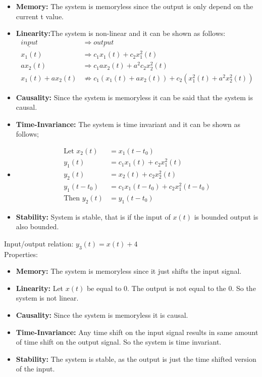 \documentclass[letterpaper,12pt]{article}
\begin{document}
\begin{itemize}
    \item \textbf{Memory:} The system is memoryless since the output is only depend on the current t value.
    \item \textbf{Linearity:}The system is non-linear and it can be shown as follows: \begin{equation}\begin{split}
        \underline{input} &\Rightarrow \underline{output} \\
        x_1(t)  & \Rightarrow c_1 x_1(t) + c_2 x_1^2(t) \\
        a x_2(t) & \Rightarrow  c_1 a x_2(t) + a^2 c_2 x_2^2(t) \\
        x_1(t) +  a x_2(t)  & \not\Rightarrow   c_1 (x_1(t) + a x_2(t)) + c_2 (x_1^2(t) + a^2 x_2^2(t) )
          \end{split}
    \end{equation} 
    \item \textbf{Causality:} Since the system is memoryless it can be said that the system is causal.
    \item \textbf{Time-Invariance:} The system is time invariant and it can be shown as follows;
    \item \begin{equation}
        \begin{split}
            \text{Let } x_2(t) &= x_1(t-t_0) \\
            y_1(t) &= c_1 x_1(t) + c_2 x_1^2(t) \\ 
            y_2(t) &= x_2(t) + c_2 x_2^2(t) \\
            y_1(t-t_0) &=    c_1 x_1(t-t_0) + c_2 x_1^2(t-t_0) \\
            \text{Then  } y_2(t) &= y_1(t-t_0)
        \end{split}
    \end{equation}
    \item \textbf{Stability:} System is stable, that is if the input of \(x(t)\) is bounded output is also bounded.
\end{itemize}


Input/output relation: \(y_3(t)= x(t)+4 \)
\\ Properties:
\begin{itemize}
    \item \textbf{Memory:} The system is memoryless since it just shifts the input signal.
    \item \textbf{Linearity:} Let  \(x(t)\) be equal to 0. The output is not equal to the 0. So the system is not linear.
    \item \textbf{Causality:} Since the system is memoryless it is causal.
    \item \textbf{Time-Invariance:} Any time shift on the input signal results in same amount of time shift on the output signal. So the system is time invariant.
    \item \textbf{Stability:} The system is stable, as the output is just the time shifted version of the input. 
\end{itemize}
\end{document}
